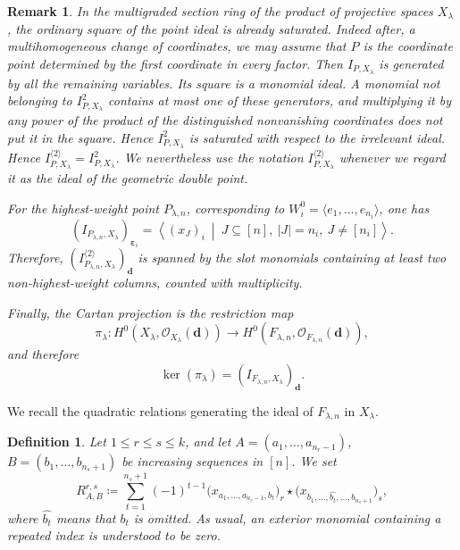 \documentclass[a4paper,reqno]{amsart}
\theoremstyle{plainnopunct}
\theoremstyle{definitionnopunct}
\newtheorem{definition}[definition]{Definition}
\newtheorem{remark}[remark]{Remark}
\newcommand{\cO}{\mathcal{O}}
\newcommand{\bd}{\mathbf{d}}
\newcommand{\bepsilon}{\boldsymbol{\varepsilon}}
\begin{document}
\begin{remark}
\label{rem: geom int of pilambda and straightening}
In the multigraded section ring of the product of projective spaces
$X_\lambda$, the ordinary square of the point ideal is already
saturated. {Indeed after, a multihomogeneous change of coordinates, we may assume
that $P$ is the coordinate point determined by the first coordinate
in every factor. Then $I_{P,X_\lambda}$ is generated by all the
remaining variables. Its square is a monomial ideal. A monomial not
belonging to $I_{P,X_\lambda}^2$ contains at most one of these
generators, and multiplying it by any power of the product of the
distinguished nonvanishing coordinates does not put it in the square.
Hence $I_{P,X_\lambda}^2$ is saturated with respect to the irrelevant
ideal.} Hence
$I_{P,X_\lambda}^{\langle2\rangle}
=
I_{P,X_\lambda}^{2}$.
We nevertheless use the notation
$I_{P,X_\lambda}^{\langle2\rangle}$ whenever we regard it as the
ideal of the geometric double point.

For the highest-weight point $P_{\lambda,n}$, corresponding to $
W_i^0
=
\langle e_1,\ldots,e_{n_i}\rangle$,
one has
\[
\left(
I_{P_{\lambda,n},X_\lambda}
\right)_{\bepsilon_i}
=
\left\langle
(x_J)_i
\ \middle|\
J\subseteq[n],\ |J|=n_i,\ J\neq[n_i]
\right\rangle.
\]
Therefore,
$\left(
I_{P_{\lambda,n},X_\lambda}^{\langle2\rangle}
\right)_{\bd}$
is spanned by the slot monomials containing at least two
non-highest-weight columns, counted with multiplicity.

Finally, the Cartan projection is the restriction map
\[
\pi_\lambda:
H^0
\left(
X_\lambda,\cO_{X_\lambda}(\bd)
\right)
\longrightarrow
H^0
\left(
F_{\lambda,n},\cO_{F_{\lambda,n}}(\bd)
\right),
\]
and therefore
\[
\ker(\pi_\lambda)
=
\left(
I_{F_{\lambda,n},X_\lambda}
\right)_{\bd}.
\]
\end{remark}

We recall the quadratic relations generating the ideal of
$F_{\lambda,n}$ in $X_\lambda$.

\begin{definition}
\label{def: straightening relations}
Let $1\leq r\leq s\leq k$,
and let $A=(a_1,\ldots,a_{n_r-1})$,
$B=(b_1,\ldots,b_{n_s+1})$
be increasing sequences in $[n]$. We set
\[
R_{A,B}^{r,s}
\coloneq
\sum_{t=1}^{n_s+1}
(-1)^{t-1}
\bigl(
x_{a_1,\ldots,a_{n_r-1},b_t}
\bigr)_r
\star
\bigl(
x_{b_1,\ldots,\widehat{b_t},\ldots,b_{n_s+1}}
\bigr)_s,
\]
where $\widehat{b_t}$ means that $b_t$ is omitted. As usual, an
exterior monomial containing a repeated index is understood to be
zero.
\end{definition}
\end{document}
